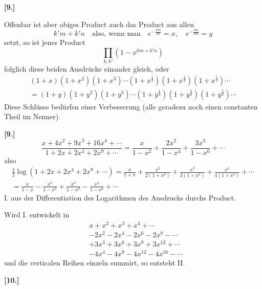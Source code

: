 \documentclass[10pt,a4paper]{article}
\begin{document}
\newpage
\textbf{[9.]}

Offenbar ist aber obiges Product auch das Product aus allen
%
\begin{equation*}
k'm + k'n \quad \text{also, wenn man} \quad e^{-\frac{\pi m}{na}} = x, \quad e^{-\frac{\pi n}{ma}} = y
\end{equation*}
%
setzt, so ist jenes Product
%
\begin{equation*}
\prod_{k,k'} (1 - x^{km + k'n})
\end{equation*}
%
folglich diese beiden Ausdrücke einander gleich, oder
%
\begin{multline*}
(1 + x)(1 + x^2)(1 + x^3) \cdots (1 + x^{\frac{1}{2}})(1 + x^{\frac{3}{2}})(1 + x^{\frac{5}{2}}) \cdots \\
= (1 + y)(1 + y^2)(1 + y^3) \cdots (1 + y^{\frac{1}{2}})(1 + y^{\frac{3}{2}})(1 + y^{\frac{5}{2}}) \cdots
\end{multline*}
%
Diese Schlüsse bedürfen einer Verbesserung (alle geradezu noch einen constanten Theil im Nenner).

\textbf{[9.]}
%
\begin{equation*}
\frac{x + 4x^2 + 9x^3 + 16x^4 + \cdots}{1 + 2x + 2x^4 + 2x^9 + \cdots} =
\frac{x}{1 - x^2} + \frac{2x^2}{1 - x^4} + \frac{3x^3}{1 - x^6} + \cdots
\end{equation*}
%
also
%
\begin{multline*}
\tfrac{1}{2}\log(1 + 2x + 2x^4 + 2x^9 + \cdots) =
\frac{x}{1 + x} + \frac{x^2}{2(1 + x^2)} + \frac{x^3}{3(1 + x^3)} + \frac{x^4}{4(1 + x^4)} + \cdots \\
= \frac{x}{1 - x} - \frac{x^2}{1 - x^2} + \frac{x^3}{1 - x^3} - \frac{x^4}{1 - x^4} + \cdots
\end{multline*}
%
I. aus der Differentiation des Logarithmen des Ausdrucks durchs Product.

Wird I. entwickelt in
%
\begin{align*}
&x + x^2 + x^3 + x^4 + \cdots \\
&- 2x^2 - 2x^4 - 2x^6 - 2x^8 - \cdots \\
&+ 3x^3 + 3x^6 + 3x^9 + 3x^{12} + \cdots \\
&- 4x^4 - 4x^8 - 4x^{12} - 4x^{16} - \cdots
\end{align*}
%
und die verticalen Reihen einzeln summirt, so entsteht II.

\newpage
\textbf{[10.]}
\end{document}
